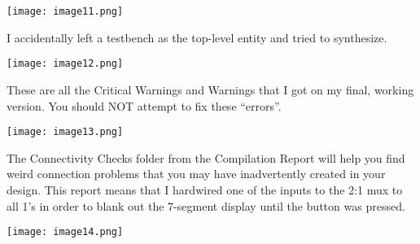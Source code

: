 \texttt{[image: image11.png]}

I accidentally left a testbench as the top-level entity and tried to
synthesize.

\texttt{[image: image12.png]}

These are all the Critical Warnings and Warnings that I got on my final,
working version. You should NOT attempt to fix these ``errors''.

\texttt{[image: image13.png]}

The Connectivity Checks folder from the Compilation Report will help you
find weird connection problems that you may have inadvertently created
in your design. This report means that I hardwired one of the inputs to
the 2:1 mux to all 1's in order to blank out the 7-segment display until
the button was pressed.

\texttt{[image: image14.png]}
